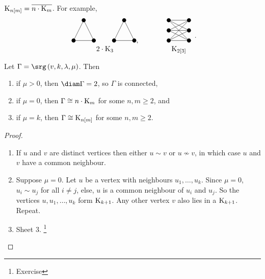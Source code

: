 \begin{note*}
$ \K_{n\sbr{m}} = \overline{n \cdot \K_m} $. For example,
$$
\begin{array}{ccc}
\begin{tikzpicture}
\fill (0, 0) circle (0.1);
\fill (-0.5, -1) circle (0.1);
\fill (0.5, -1) circle (0.1);
\fill (2, 0) circle (0.1);
\fill (1.5, -1) circle (0.1);
\fill (2.5, -1) circle (0.1);
\draw (0, 0) to (-0.5, -1);
\draw (0, 0) to (0.5, -1);
\draw (-0.5, -1) to (0.5, -1);
\draw (2, 0) to (1.5, -1);
\draw (2, 0) to (2.5, -1);
\draw (1.5, -1) to (2.5, -1);
\end{tikzpicture},
& \qquad &
\begin{tikzpicture}
\fill (0, 0) circle (0.1);
\fill (0, -0.5) circle (0.1);
\fill (0, -1) circle (0.1);
\fill (1, 0) circle (0.1);
\fill (1, -0.5) circle (0.1);
\fill (1, -1) circle (0.1);
\draw (0, 0) to (1, 0);
\draw (0, 0) to (1, -0.5);
\draw (0, 0) to (1, -1);
\draw (0, -0.5) to (1, 0);
\draw (0, -0.5) to (1, -0.5);
\draw (0, -0.5) to (1, -1);
\draw (0, -1) to (1, 0);
\draw (0, -1) to (1, -0.5);
\draw (0, -1) to (1, -1);
\end{tikzpicture}
\\
2 \cdot \K_3 & & \K_{2\sbr{3}}
\end{array}.
$$
\end{note*}

\begin{proposition}
\label{prop:2.2}
Let $ \Gamma = \srg\br{v, k, \lambda, \mu} $. Then
\begin{enumerate}
\item if $ \mu > 0 $, then $ \diam \Gamma = 2 $, so $ \Gamma $ is connected,
\item if $ \mu = 0 $, then $ \Gamma \cong n \cdot \mathrm{K}_m $ for some $ n, m \ge 2 $, and
\item if $ \mu = k $, then $ \Gamma \cong \K_{n\sbr{m}} $ for some $ n, m \ge 2 $.
\end{enumerate}
\end{proposition}

\begin{proof}
\hfill
\begin{enumerate}
\item If $ u $ and $ v $ are distinct vertices then either $ u \sim v $ or $ u \nsim v $, in which case $ u $ and $ v $ have a common neighbour.
\item Suppose $ \mu = 0 $. Let $ u $ be a vertex with neighbours $ u_1, \dots, u_k $. Since $ \mu = 0 $, $ u_i \sim u_j $ for all $ i \ne j $, else, $ u $ is a common neighbour of $ u_i $ and $ u_j $. So the vertices $ u, u_1, \dots, u_k $ form $ \mathrm{K}_{k + 1} $. Any other vertex $ v $ also lies in a $ \mathrm{K}_{k + 1} $. Repeat.
\item Sheet $ 3 $. \footnote{Exercise}
\end{enumerate}
\end{proof}

